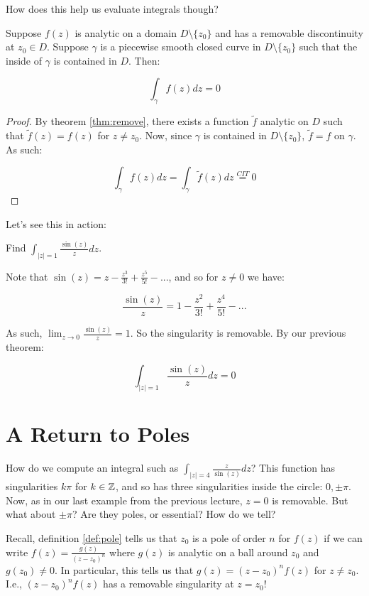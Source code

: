 How does this help us evaluate integrals though?

\begin{thmbo}{}{} Suppose $f(z)$ is analytic on a domain $D\setminus\{z_0\}$ and has a removable discontinuity at $z_0\in D$. Suppose $\gamma$ is a piecewise smooth closed curve in $D\setminus\{z_0\}$ such that the inside of $\gamma$ is contained in $D$. Then:

$$\int_{\gamma} f(z)dz = 0$$
\end{thmbo}

\begin{proof} By theorem \ref{thm:remove}, there exists a function $\tilde{f}$ analytic on $D$ such that $\tilde{f}(z) = f(z)$ for $z\ne z_0$. Now, since $\gamma$ is contained in $D\setminus\{z_0\}$, $\tilde{f} = f$ on $\gamma$. As such:

$$\int_{\gamma} f(z)dz = \int_{\gamma} \tilde{f}(z)dz \stackrel{CIT}{=} 0$$
\end{proof}


Let's see this in action:

\begin{ex}{}{} Find $\int_{|z| = 1} \frac{\sin(z)}{z}dz$.

Note that $\sin(z) = z - \frac{z^3}{3!} + \frac{z^5}{5!} - ...$, and so for $z\ne 0$ we have:

$$\frac{\sin(z)}{z} = 1 - \frac{z^2}{3!} + \frac{z^4}{5!} - ...$$

As such, $\lim_{z\rightarrow 0} \frac{\sin(z)}{z} = 1$. So the singularity is removable. By our previous theorem:

$$\int_{|z| = 1} \frac{\sin(z)}{z}dz = 0$$
\end{ex}



\section{A Return to Poles}


How do we compute an integral such as $\int_{|z| = 4} \frac{z}{\sin(z)}dz$? This function has singularities $k\pi$ for $k\in \mathbb{Z}$, and so has three singularities inside the circle: $0, \pm \pi$. Now, as in our last example from the previous lecture, $z = 0$ is removable. But what about $\pm \pi$? Are they poles, or essential? How do we tell?

Recall, definition \ref{def:pole} tells us that $z_0$ is a pole of order $n$ for $f(z)$ if we can write $f(z) = \frac{g(z)}{(z-z_0)^n}$ where $g(z)$ is analytic on a ball around $z_0$ and $g(z_0) \ne 0$. In particular, this tells us that $g(z) = (z-z_0)^nf(z)$ for $z \ne z_0$. I.e., $(z-z_0)^nf(z)$ has a removable singularity at $z = z_0$!

